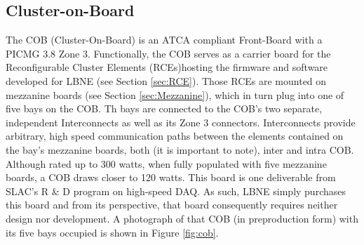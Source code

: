 

\subsection{Cluster-on-Board}
\label{sec:COB}
The COB (Cluster-On-Board) is an ATCA compliant Front-Board with a PICMG 3.8 Zone 3. 
Functionally, the COB serves as a carrier board for the Reconfigurable Cluster
Elements (RCEs)hosting the firmware and software developed for LBNE (see Section \ref{sec:RCE}). 
Those RCEs are mounted on mezzanine boards (see Section \ref{sec:Mezzanine}), 
which in turn plug into one of five bays on the COB. 
Th bays are connected to the COB's two separate, 
independent Interconnects as well as its Zone 3 connectors. 
Interconnects provide arbitrary, high speed communication 
paths between the elements contained on the bay's mezzanine boards,
both (it is important to note), inter and intra COB.
Although rated up to 300 watts, when fully populated with five mezzanine boards, 
a COB draws closer to 120 watts. 
This board is one deliverable from SLAC's R \& D program on high-speed DAQ. 
As such, LBNE simply purchases this board and from its perspective, 
that board consequently requires neither design nor development.
A photograph of that COB (in preproduction form) with its five bays 
occupied is shown in Figure \ref{fig:cob}.



